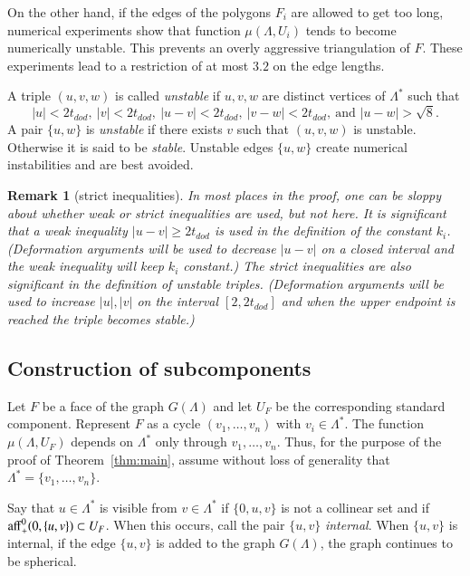 \documentclass{article} %
\newtheorem{remark}[lemma]{Remark}
\begin{document}
On the other hand, if the edges of the polygons $F_i$ are allowed
to get too long, numerical experiments show that function $\mu(\Lambda,U_i)$
tends to become numerically unstable.  This prevents 
an overly aggressive  triangulation of $F$.
These experiments lead
 to a restriction of at most $3.2$ on the edge lengths.

A triple $(u,v,w)$ is called {\it unstable}
if $u,v,w$ are distinct vertices of $\Lambda^*$ such
that 
\begin{equation}\label{eqn:stable}
|u| < 2t_{dod},\ |v| < 2 t_{dod},\ |u-v|< 2t_{dod},\  |v-w|< 2t_{dod},\ \text{and } |u-w|>\sqrt8.
\end{equation}
 A pair $\{u,w\}$ is {\it
unstable} if there exists $v$ such that $(u,v,w)$ is unstable.
Otherwise it is said to be {\it stable}. Unstable edges $\{u,w\}$
create numerical instabilities and are best avoided.

\begin{remark}[strict inequalities] \label{rem:strict}
In most places in the proof, one can be sloppy about whether weak or
strict inequalities are used, but not here.  It is significant that
a weak inequality $|u - v|\ge 2t_{dod}$ is used in the definition
of the constant $k_i$.  (Deformation arguments will be used to decrease
$|u-v|$ on a closed interval and the weak inequality will keep $k_i$
constant.)
The strict inequalities  
are also significant in the definition of unstable triples.  (Deformation
arguments will be used to increase $|u|,|v|$ on the interval $[2,2t_{dod}]$
and when the upper endpoint is reached the triple becomes stable.)
\end{remark}

\subsection{Construction of subcomponents}
\label{sec:sub}

Let $F$ be a face of the graph $G(\Lambda)$ and let $U_F$ be the
corresponding standard component.  Represent $F$ as a cycle
$(v_1,\ldots,v_n)$ with $v_i\in\Lambda^*$.  The function
$\mu(\Lambda,U_F)$ depends  on $\Lambda^*$ only through
$v_1,\ldots,v_n$.  Thus, for the purpose of the proof of
Theorem~\ref{thm:main},  assume without loss of generality
that $\Lambda^* = \{v_1,\ldots,v_n\}$.

Say that $u\in\Lambda^*$ is visible from $v\in\Lambda^*$ if
$\{0,u,v\}$ is not a collinear set and if
${\operatorname{aff}}_+^0(0,\{u,v\})\subset U_F$.  When this occurs, 
call the pair $\{u,v\}$ {\it internal}.  When $\{u,v\}$
is  internal, if the edge $\{u,v\}$ is added to the
graph $G(\Lambda)$, the graph continues to be spherical.
\end{document}
